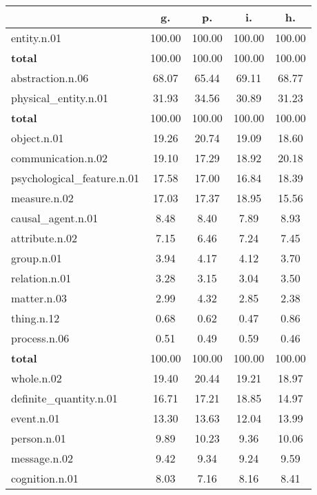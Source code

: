 \begin{table}[h!]
\begin{center}
\begin{tabular}{| l || c | c | c | c |}\hline
 & {\bf g.} & {\bf p.} & {\bf i.} & {\bf h.} \\\hline\hline
entity.n.01 & 100.00  & 100.00  & 100.00  & 100.00 \\\hline\hline
{{\bf total}} & 100.00  & 100.00  & 100.00  & 100.00 \\\hline\hline\hline
abstraction.n.06 & 68.07  & 65.44  & 69.11  & 68.77 \\\hline
physical\_entity.n.01 & 31.93  & 34.56  & 30.89  & 31.23 \\\hline\hline
{{\bf total}} & 100.00  & 100.00  & 100.00  & 100.00 \\\hline\hline\hline
object.n.01 & 19.26  & 20.74  & 19.09  & 18.60 \\\hline
communication.n.02 & 19.10  & 17.29  & 18.92  & 20.18 \\\hline
psychological\_feature.n.01 & 17.58  & 17.00  & 16.84  & 18.39 \\\hline
measure.n.02 & 17.03  & 17.37  & 18.95  & 15.56 \\\hline
causal\_agent.n.01 & 8.48  & 8.40  & 7.89  & 8.93 \\\hline
attribute.n.02 & 7.15  & 6.46  & 7.24  & 7.45 \\\hline
group.n.01 & 3.94  & 4.17  & 4.12  & 3.70 \\\hline
relation.n.01 & 3.28  & 3.15  & 3.04  & 3.50 \\\hline
matter.n.03 & 2.99  & 4.32  & 2.85  & 2.38 \\\hline
thing.n.12 & 0.68  & 0.62  & 0.47  & 0.86 \\\hline
process.n.06 & 0.51  & 0.49  & 0.59  & 0.46 \\\hline\hline
{{\bf total}} & 100.00  & 100.00  & 100.00  & 100.00 \\\hline\hline\hline
whole.n.02 & 19.40  & 20.44  & 19.21  & 18.97 \\\hline
definite\_quantity.n.01 & 16.71  & 17.21  & 18.85  & 14.97 \\\hline
event.n.01 & 13.30  & 13.63  & 12.04  & 13.99 \\\hline
person.n.01 & 9.89  & 10.23  & 9.36  & 10.06 \\\hline
message.n.02 & 9.42  & 9.34  & 9.24  & 9.59 \\\hline
cognition.n.01 & 8.03  & 7.16  & 8.16  & 8.41 \\\hline

\end{tabular}
\end{center}
\end{table}
